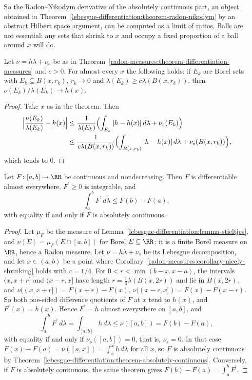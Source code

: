 So the Radon--Nikodym derivative of the absolutely continuous part, an object obtained in Theorem~\ref{lebesgue-differentiation:theorem-radon-nikodym} by an abstract Hilbert space argument, can be computed as a
limit of ratios. Balls are not essential: any sets that shrink to $x$ and occupy a fixed proportion of a ball around $x$ will do.

\begin{corollary}\label{radon-measures:corollary-nicely-shrinking}
Let $\nu = h\lambda + \nu_s$ be as in Theorem~\ref{radon-measures:theorem-differentiation-measures} and $c > 0$. For almost every $x$ the following holds: if $E_k$ are Borel sets with
$E_k \subseteq B(x, r_k)$, $r_k \to 0$ and $\lambda(E_k) \geq c\lambda(B(x, r_k))$, then $\nu(E_k)/\lambda(E_k) \to h(x)$.
\end{corollary}

\begin{proof}
Take $x$ as in the theorem. Then
\[\begin{aligned}
\Bigl|\frac{\nu(E_k)}{\lambda(E_k)} - h(x)\Bigr| &\leq \frac1{\lambda(E_k)}\Bigl(\int_{E_k}|h - h(x)|\,d\lambda + \nu_s(E_k)\Bigr) \\
&\leq \frac1{c\lambda(B(x, r_k))}\Bigl(\int_{B(x, r_k)}|h - h(x)|\,d\lambda + \nu_s(B(x, r_k))\Bigr),
\end{aligned}\]
which tends to $0$.
\end{proof}

\begin{corollary}\label{radon-measures:corollary-monotone-differentiable}
Let $F \colon [a, b] \to \RR$ be continuous and nondecreasing. Then $F$ is differentiable almost everywhere, $F^{\prime} \geq 0$ is integrable, and
\[
\int_a^bF^{\prime}\,d\lambda \leq F(b) - F(a),
\]
with equality if and only if $F$ is absolutely continuous.
\end{corollary}

\begin{proof}
Let $\mu_F$ be the measure of Lemma~\ref{lebesgue-differentiation:lemma-stieltjes}, and $\nu(E) = \mu_F(E \cap [a, b])$ for Borel $E \subseteq \RR$; it is a finite Borel measure on $\RR$, hence a Radon measure. Let
$\nu = h\lambda + \nu_s$ be its Lebesgue decomposition, and let $x \in (a, b)$ be a point where Corollary~\ref{radon-measures:corollary-nicely-shrinking} holds with $c = 1/4$. For
$0 < r < \min(b - x, x - a)$, the intervals $(x, x + r]$ and $(x - r, x]$ have length $r = \frac14\lambda(B(x, 2r))$ and lie in $B(x, 2r)$, and
$\nu((x, x + r]) = F(x + r) - F(x)$, $\nu((x - r, x]) = F(x) - F(x - r)$. So both one-sided difference quotients of $F$ at $x$ tend to $h(x)$, and $F^{\prime}(x) = h(x)$. Hence $F^{\prime} = h$ almost
everywhere on $[a, b]$, and
\[
\int_a^bF^{\prime}\,d\lambda = \int_{[a, b]}h\,d\lambda \leq \nu([a, b]) = F(b) - F(a),
\]
with equality if and only if $\nu_s([a, b]) = 0$, that is, $\nu_s = 0$. In that case $F(x) - F(a) = \nu([a, x]) = \int_a^xh\,d\lambda$ for all $x$, so $F$ is absolutely continuous by
Theorem~\ref{lebesgue-differentiation:theorem-absolutely-continuous}. Conversely, if $F$ is absolutely continuous, the same theorem gives $F(b) - F(a) = \int_a^bF^{\prime}$.
\end{proof}

